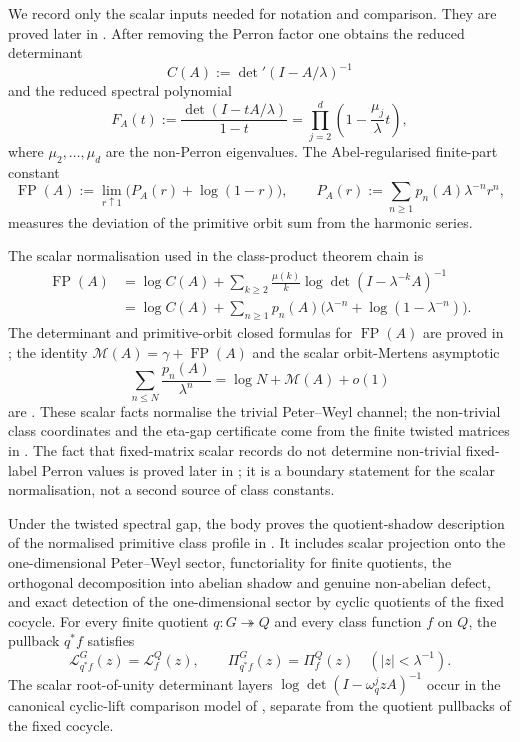 \documentclass[11pt,a4paper]{amsart}
\theoremstyle{plain}
\theoremstyle{definition}
\theoremstyle{remark}
\DeclareMathOperator{\FP}{FP}
\begin{document}
We record only the scalar inputs needed for notation and comparison.
They are proved later in . After removing the
Perron factor one obtains the reduced determinant
\[
  C(A):=\det\nolimits'(I-A/\lambda)^{-1}
\]
and the reduced spectral polynomial
\[
  F_A(t):=\frac{\det(I-tA/\lambda)}{1-t}
  =\prod_{j=2}^d\left(1-\frac{\mu_j}{\lambda}t\right),
\]
where \(\mu_2,\dots,\mu_d\) are the non-Perron eigenvalues. The
Abel-regularised finite-part constant
\[
  \FP(A):=\lim_{r\uparrow 1}\bigl(P_A(r)+\log(1-r)\bigr),
  \qquad
  P_A(r):=\sum_{n\ge 1}p_n(A)\lambda^{-n}r^n,
\]
measures the deviation of the primitive orbit sum from the harmonic
series.

The scalar normalisation used in the class-product theorem chain is
\begin{align*}
  \FP(A)
  &=\log C(A)
    +\sum_{k\ge 2}\frac{\mu(k)}{k}
      \log\det(I-\lambda^{-k}A)^{-1}\\
  &=\log C(A)
    +\sum_{n\ge 1}p_n(A)
      \bigl(\lambda^{-n}+\log(1-\lambda^{-n})\bigr).
\end{align*}
The determinant and primitive-orbit closed formulas for \(\FP(A)\) are proved
in ; the identity
\(\mathcal M(A)=\gamma+\FP(A)\) and the scalar orbit-Mertens asymptotic
\[
  \sum_{n\le N}\frac{p_n(A)}{\lambda^n}
  =\log N+\mathcal M(A)+o(1)
\]
are .  These scalar facts normalise
the trivial Peter--Weyl channel; the non-trivial class coordinates and the
eta-gap certificate come from the finite twisted matrices in
.
The fact that fixed-matrix scalar records do not determine non-trivial
fixed-label Perron values is proved later in
;
it is a boundary statement for the scalar normalisation, not a second source
of class constants.

Under the twisted spectral gap, the body proves the quotient-shadow description
of the normalised primitive class profile in
.
It includes scalar projection onto the one-dimensional Peter--Weyl sector,
functoriality for finite quotients, the orthogonal decomposition into abelian
shadow and genuine non-abelian defect, and exact detection of the
one-dimensional sector by cyclic quotients of the fixed cocycle.  For every
finite quotient \(q:G\twoheadrightarrow Q\) and every class function \(f\) on
\(Q\), the pullback \(q^\ast f\) satisfies
\[
  \mathcal L^G_{q^\ast f}(z)=\mathcal L^Q_f(z),
  \qquad
  \Pi^G_{q^\ast f}(z)=\Pi^Q_f(z)
  \quad(|z|<\lambda^{-1}).
\]
The scalar root-of-unity determinant layers
\(\log\det(I-\omega_q^jzA)^{-1}\) occur in the canonical cyclic-lift comparison
model of
,
separate from the quotient pullbacks of the fixed cocycle.
\end{document}
